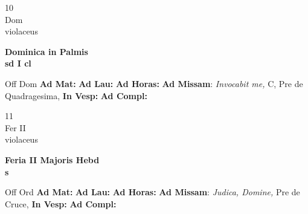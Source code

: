 \documentclass[10pt, openany]{book}
\begin{document}
        \begin{center}
            \begin{minipage}{3.5in}
                \vspace{2em}
                \begin{minipage}{0.5in}
                    {\Huge 10} \\
                    {\normalsize Dom} \\
                    {\normalsize violaceus}
                \end{minipage}
                \begin{minipage}{3.0in}
                    \textbf{ \large Dominica in Palmis \\
                    \textnormal{\normalsize sd I cl}} \\ 
                \end{minipage}
                \begin{justify}Off Dom
                    \textbf{Ad Mat: }
                    \textbf{Ad Lau: }
                    \textbf{Ad Horas: }\textbf{Ad Missam}: \textit{Invocabit me,} C, Pre de Quadragesima,  
                    \textbf{In Vesp: }
                    \textbf{Ad Compl: }
                \end{justify}
            \end{minipage}
        \end{center}
    
        \begin{center}
            \begin{minipage}{3.5in}
                \vspace{2em}
                \begin{minipage}{0.5in}
                    {\Huge 11} \\
                    {\normalsize Fer II} \\
                    {\normalsize violaceus}
                \end{minipage}
                \begin{minipage}{3.0in}
                    \textbf{ \large Feria II Majoris Hebd \\
                    \textnormal{\normalsize s}} \\ 
                \end{minipage}
                \begin{justify}Off Ord
                    \textbf{Ad Mat: }
                    \textbf{Ad Lau: }
                    \textbf{Ad Horas: }\textbf{Ad Missam}: \textit{Judica, Domine,} Pre de Cruce,  
                    \textbf{In Vesp: }
                    \textbf{Ad Compl: }
                \end{justify}
            \end{minipage}
        \end{center}
    
\end{document}

